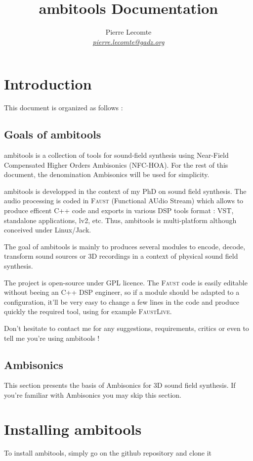 \documentclass[10pt,a4paper]{article}
\author{Pierre Lecomte \\ \textit{ \href{mailto:pierre.lecomte@gadz.org}{pierre.lecomte@gadz.org}}}
\title{ambitools Documentation}
\begin{document}
\maketitle
\tableofcontents
\section{Introduction}
This document is organized as follows :

\subsection{Goals of ambitools}
ambitools is a collection of tools for sound-field synthesis using Near-Field Compensated Higher Orders Ambisonics (NFC-HOA). For the rest of this document, the denomination Ambisonics will be used for simplicity.

ambitools is developped in the context of my PhD on sound field synthesis. The audio processing is coded in \textsc{Faust} (Functional AUdio Stream) which allows to produce efficent C++ code and exports in various DSP tools format : VST, standalone applications, lv2, etc. Thus, ambitools is multi-platform although conceived under Linux/Jack.

The goal of ambitools is mainly to produces several modules to encode, decode, transform sound sources or 3D recordings in a context of physical sound field synthesis. 

The project is open-source under GPL licence. The \textsc{Faust} code is easily editable without beeing an C++ DSP engineer, so if a module should be adapted to a configuration, it'll be very easy to change a few lines in the code and produce quickly the required tool, using for example \textsc{FaustLive}.

Don't hesitate to contact me for any suggestions, requirements, critics or even to tell me you're using ambitools !

\subsection{Ambisonics}
This section presents the basis of Ambisonics for 3D sound field synthesis. If you're familiar with Ambisonics you may skip this section.

\section{Installing ambitools}
To install ambitools, simply go on the github repository and clone it
\end{document}
